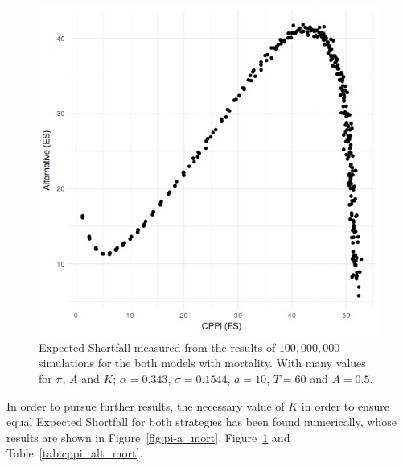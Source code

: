 \begin{figure}
    \centering
    \includegraphics[scale=0.5]{./images/es-es.png}
    \caption{Expected Shortfall measured from the results of $100,000,000$ simulations for the both models with mortality. With  many values for $\pi$, $A$ and $K$; $\alpha = 0.343$, $\sigma = 0.1544$, $a = 10$, $T = 60$ and $A = 0.5$.}
    \label{fig:es-es_mort}
\end{figure}

In order to pursue further results, the necessary value of $K$ in order to ensure equal Expected Shortfall for both strategies has been found numerically, whose results are shown in Figure~\ref{fig:pi-a_mort}, Figure~\ref{fig:es-es_mort} and Table~\ref{tab:cppi_alt_mort}.


